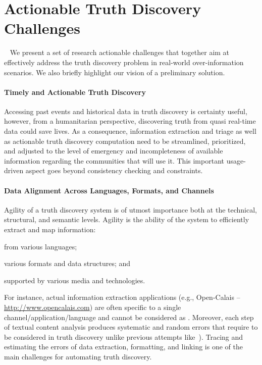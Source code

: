 \documentclass[prodmode,acmtecs]{acmsmall} %
\begin{document}
\section{Actionable Truth Discovery Challenges}~\label{sect:challenges-solutions}
We present a set of research actionable challenges that together aim at effectively address 
the truth discovery problem in real-world over-information scenarios. We also briefly highlight
our vision of a preliminary solution.

\paragraph*{Timely and Actionable Truth Discovery} 
Accessing past events and historical data in truth discovery is certainty useful, however,
from a humanitarian perspective, discovering truth from quasi real-time data 
could save lives. As a consequence, information extraction and triage as well as actionable
truth discovery computation need to be streamlined, prioritized,  and adjusted to the level 
of emergency and incompleteness of available information regarding the communities that will 
use it. This important usage-driven aspect goes beyond consistency checking and constraints.
%

\paragraph*{Data Alignment Across Languages, Formats, and Channels} 
Agility of a truth discovery system is of utmost importance both at 
the technical, structural, and semantic levels. 
Agility is the ability of the system 
to efficiently extract and map information: 
\begin{inparaenum}[(i)]
\item from various languages;
\item various formats and data structures; and
\item supported by various media and technologies.
\end{inparaenum}
For instance, actual information extraction applications (e.g., Open-Calais -- \url{http://www.opencalais.com})  
are often specific to a single channel/application/language and cannot be considered as . Moreover,
each step of textual content analysis produces systematic and random errors that 
require to be considered in truth discovery unlike previous attempts like~\cite{GoasdoueKKLMZ13}). 
Tracing and estimating  the errors of data extraction, formatting, and linking
is one of the main challenges for automating truth discovery. 
%
\end{document}
